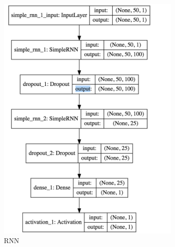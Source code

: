 \documentclass[11pt]{article}
\begin{document}
\begin{figure}
\begin{subfigure}[b]{0.3\textwidth}
        \includegraphics[width=\textwidth]{media/rnn-network}
        \caption{RNN}
        \label{fig:rnn-network}
    \end{subfigure}
    ~ %
    \begin{subfigure}[b]{0.3\textwidth}

\end{subfigure}
\end{figure}
\end{document}
